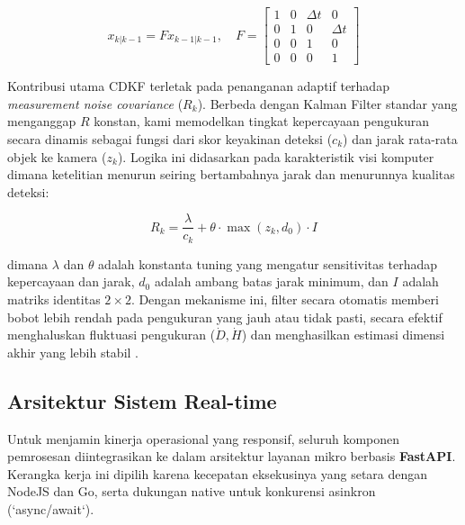 \documentclass{iopjournal}
\begin{document}
\begin{equation}
x_{k|k-1} = F x_{k-1|k-1}, \quad F = \begin{bmatrix} 1 & 0 & \Delta t & 0 \\ 0 & 1 & 0 & \Delta t \\ 0 & 0 & 1 & 0 \\ 0 & 0 & 0 & 1 \end{bmatrix}
\end{equation}

Kontribusi utama CDKF terletak pada penanganan adaptif terhadap \textit{measurement noise covariance} ($R_k$). Berbeda dengan Kalman Filter standar yang menganggap $R$ konstan, kami memodelkan tingkat kepercayaan pengukuran secara dinamis sebagai fungsi dari skor keyakinan deteksi ($c_k$) dan jarak rata-rata objek ke kamera ($z_k$). Logika ini didasarkan pada karakteristik visi komputer dimana ketelitian menurun seiring bertambahnya jarak dan menurunnya kualitas deteksi:

\begin{equation}
R_k = \frac{\lambda}{c_k} + \theta \cdot \max(z_k, d_0) \cdot I
\end{equation}

dimana $\lambda$ dan $\theta$ adalah konstanta tuning yang mengatur sensitivitas terhadap kepercayaan dan jarak, $d_0$ adalah ambang batas jarak minimum, dan $I$ adalah matriks identitas $2 \times 2$. Dengan mekanisme ini, filter secara otomatis memberi bobot lebih rendah pada pengukuran yang jauh atau tidak pasti, secara efektif menghaluskan fluktuasi pengukuran ($\dot{D}, \dot{H}$) dan menghasilkan estimasi dimensi akhir yang lebih stabil \cite{rahman2025}.

\subsection{Arsitektur Sistem Real-time}
Untuk menjamin kinerja operasional yang responsif, seluruh komponen pemrosesan diintegrasikan ke dalam arsitektur layanan mikro berbasis \textbf{FastAPI}. Kerangka kerja ini dipilih karena kecepatan eksekusinya yang setara dengan NodeJS dan Go, serta dukungan native untuk konkurensi asinkron (`async/await`).
\end{document}
